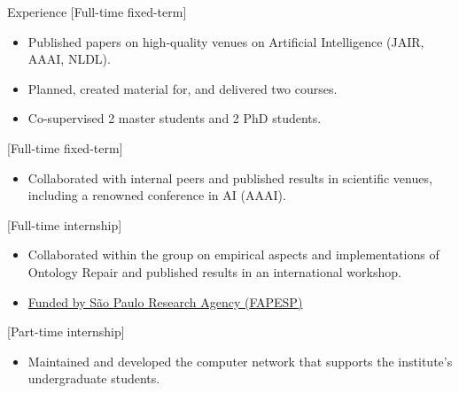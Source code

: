 %

\begin{rSection}{Experience}
    [Full-time fixed-term]{%
        \begin{itemize}
            \item Published papers on high-quality venues on Artificial Intelligence (JAIR, AAAI, NLDL).
            \item Planned, created material for, and delivered two courses.
            \item Co-supervised 2 master students and 2 PhD students.
        \end{itemize}%
    }

    [Full-time fixed-term]{%
        \begin{itemize}
            \item Collaborated with internal peers and published results in scientific venues, including a renowned conference in AI (AAAI).
        \end{itemize}%
    }

    [Full-time internship]{%
        \begin{itemize}
            \item Collaborated within the group on empirical aspects and implementations of Ontology Repair and published results in an international workshop.

            \item \href{https://bv.fapesp.br/en/bolsas/176114/improving-efficiency-of-belief-base-change-in-description-logics-with-modularity-in-ontologies/}{Funded by São Paulo Research Agency ({FAPESP})}
        \end{itemize}%
    }

    [Part-time internship]{%
        \begin{itemize}
            \item Maintained and developed the computer network that supports the institute's undergraduate students.
        \end{itemize}%
    }
\end{rSection}
